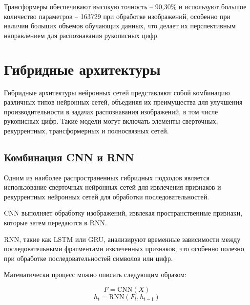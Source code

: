 Трансформеры обеспечивают высокую точность  – 90,30\% и используют большое 
количество параметров – 163729 при обработке изображений, особенно при наличии 
больших объемов обучающих данных, что делает их перспективным направлением для 
распознавания рукописных цифр\cite{Agrawal}.

\section{Гибридные архитектуры}\par
\hspace*{12.5 mm}Гибридные архитектуры нейронных сетей представляют собой 
комбинацию различных типов нейронных сетей, объединяя их преимущества для 
улучшения производительности в задачах распознавания изображений, в том числе 
рукописных цифр. Такие модели могут включать элементы сверточных, рекуррентных, 
трансформерных и полносвязных сетей.

\subsection{Комбинация CNN и RNN}
\hspace*{12.5 mm}Одним из наиболее распространенных гибридных подходов является 
использование сверточных нейронных сетей для извлечения признаков и 
рекуррентных нейронных сетей для обработки последовательностей. 

CNN выполняет обработку изображений, извлекая пространственные признаки, 
которые затем передаются в RNN.\@

RNN, такие как LSTM или GRU, анализируют временные зависимости между 
последовательными фрагментами извлеченных признаков, что особенно полезно 
при обработке последовательностей символов или цифр.

Математически процесс можно описать следующим образом:

\begin{equation}
    F = \text{CNN}(X)
\end{equation}
\begin{equation}
    h_t = \text{RNN}(F_t, h_{t-1})
\end{equation}

